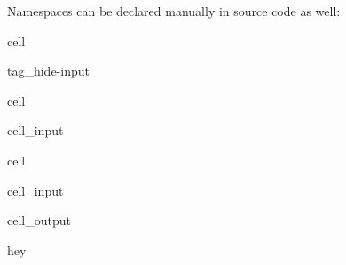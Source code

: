 \documentclass[a4paper,10pt,english]{jupyterBook}
\begin{document}
\sphinxAtStartPar
Namespaces can be declared manually in source code as well:

\begin{sphinxuseclass}{cell}
\begin{sphinxuseclass}{tag_hide-input}
\end{sphinxuseclass}
\end{sphinxuseclass}
\begin{sphinxuseclass}{cell}\begin{sphinxVerbatimInput}

\begin{sphinxuseclass}{cell_input}
\begin{sphinxVerbatim}[commandchars=\\\{\}]
\end{sphinxVerbatim}

\end{sphinxuseclass}\end{sphinxVerbatimInput}

\end{sphinxuseclass}
\begin{sphinxuseclass}{cell}\begin{sphinxVerbatimInput}

\begin{sphinxuseclass}{cell_input}
\begin{sphinxVerbatim}[commandchars=\\\{\}]
\end{sphinxVerbatim}

\end{sphinxuseclass}\end{sphinxVerbatimInput}
\begin{sphinxVerbatimOutput}

\begin{sphinxuseclass}{cell_output}
\begin{sphinxVerbatim}[commandchars=\\\{\}]
hey
\end{sphinxVerbatim}

\end{sphinxuseclass}\end{sphinxVerbatimOutput}

\end{sphinxuseclass}
\sphinxstepscope
\end{document}
